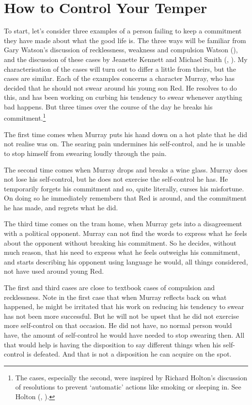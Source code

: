 \documentclass[
  10pt,
  letterpaper,
  DIV=11,
  numbers=noendperiod,
  twoside]{scrartcl}
\begin{document}
\section{How to Control Your Temper}\label{how-to-control-your-temper}

To start, let's consider three examples of a person failing to keep a
commitment they have made about what the good life is. The three ways
will be familiar from Gary Watson's discussion of recklessness, weakness
and compulsion Watson (), and the
discussion of these cases by Jeanette Kennett and Michael Smith
(,
). My characterisation of the
cases will turn out to differ a little from theirs, but the cases are
similar. Each of the examples concerns a character Murray, who has
decided that he should not swear around his young son Red. He resolves
to do this, and has been working on curbing his tendency to swear
whenever anything bad happens. But three times over the course of the
day he breaks his commitment.\footnote{The cases, especially the second,
  were inspired by Richard Holton's discussion of resolutions to prevent
  `automatic' actions like smoking or sleeping in. See Holton
  (, ).}

The first time comes when Murray puts his hand down on a hot plate that
he did not realise was on. The searing pain undermines his self-control,
and he is unable to stop himself from swearing loudly through the pain.

The second time comes when Murray drops and breaks a wine glass. Murray
does not lose his self-control, but he does not exercise the
self-control he has. He temporarily forgets his commitment and so, quite
literally, curses his misfortune. On doing so he immediately remembers
that Red is around, and the commitment he has made, and regrets what he
did.

The third time comes on the tram home, when Murray gets into a
disagreement with a political opponent. Murray can not find the words to
express what he feels about the opponent without breaking his
commitment. So he decides, without much reason, that his need to express
what he feels outweighs his commitment, and starts describing his
opponent using language he would, all things considered, not have used
around young Red.

The first and third cases are close to textbook cases of compulsion and
recklessness. Note in the first case that when Murray reflects back on
what happened, he might be irritated that his work on reducing his
tendency to swear has not been more successful. But he will not be upset
that he did not exercise more self-control on that occasion. He did not
have, no normal person would have, the amount of self-control he would
have needed to stop swearing then. All that would help is having the
disposition to say different things when his self-control is defeated.
And that is not a disposition he can acquire on the spot.
\end{document}
